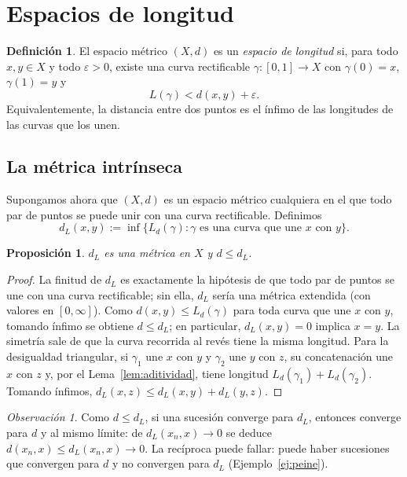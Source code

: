 \documentclass[12pt, a4paper]{amsart}
\newtheorem{proposicion}[teorema]{Proposición}
\theoremstyle{definition}
\newtheorem{definicion}[teorema]{Definición}
\theoremstyle{remark}
\newtheorem{observacion}[teorema]{Observación}
\begin{document}
\section{Espacios de longitud}

\begin{definicion}
El espacio métrico $(X,d)$ es un \emph{espacio de longitud} si, para todo $x,y\in X$ y todo $\varepsilon>0$, existe una curva rectificable $\gamma\colon[0,1]\to X$ con $\gamma(0)=x$, $\gamma(1)=y$ y
\[
L(\gamma)<d(x,y)+\varepsilon.
\]
Equivalentemente, la distancia entre dos puntos es el ínfimo de las longitudes de las curvas que los unen.
\end{definicion}

\subsection{La métrica intrínseca}

Supongamos ahora que $(X,d)$ es un espacio métrico cualquiera en el que todo par de puntos se puede unir con una curva rectificable. Definimos
\[
d_L(x,y):=\inf\{L_d(\gamma) : \gamma \text{ es una curva que une } x \text{ con } y\}.
\]

\begin{proposicion}\label{prop:dL-metrica}
$d_L$ es una métrica en $X$ y $d\le d_L$.
\end{proposicion}

\begin{proof}
La finitud de $d_L$ es exactamente la hipótesis de que todo par de puntos se une con una curva rectificable; sin ella, $d_L$ sería una métrica extendida (con valores en $[0,\infty]$). Como $d(x,y)\le L_d(\gamma)$ para toda curva que une $x$ con $y$, tomando ínfimo se obtiene $d\le d_L$; en particular, $d_L(x,y)=0$ implica $x=y$. La simetría sale de que la curva recorrida al revés tiene la misma longitud. Para la desigualdad triangular, si $\gamma_1$ une $x$ con $y$ y $\gamma_2$ une $y$ con $z$, su concatenación une $x$ con $z$ y, por el Lema~\ref{lem:aditividad}, tiene longitud $L_d(\gamma_1)+L_d(\gamma_2)$. Tomando ínfimos, $d_L(x,z)\le d_L(x,y)+d_L(y,z)$.
\end{proof}

\begin{observacion}\label{obs:sucesiones}
Como $d\le d_L$, si una sucesión converge para $d_L$, entonces converge para $d$ y al mismo límite: de $d_L(x_n,x)\to0$ se deduce $d(x_n,x)\le d_L(x_n,x)\to0$. La recíproca puede fallar: puede haber sucesiones que convergen para $d$ y no convergen para $d_L$ (Ejemplo~\ref{ej:peine}).
\end{observacion}
\end{document}
